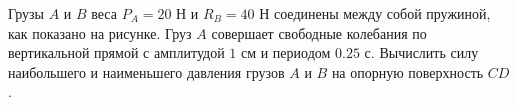Грузы $A$ и $B$ веса $P_A = 20$ Н и $R_B = 40$ Н соединены между собой пружиной,
как показано на рисунке.
Груз $A$ совершает свободные колебания по вертикальной прямой
с амплитудой $1$ см и периодом $0.25$ с.
Вычислить силу наибольшего и наименьшего давления
грузов $A$  и $B$ на опорную поверхность $CD$.
